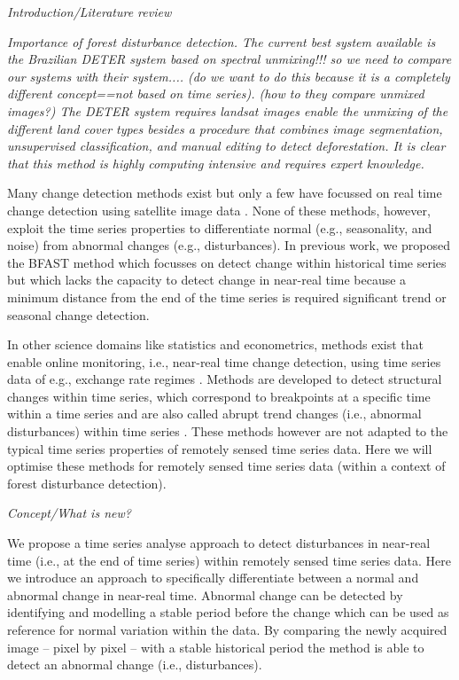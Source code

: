 \documentclass[authoryear,preprint,review,10pt]{elsarticle}
\begin{document}
\emph{Introduction/Literature review}

\emph{Importance of forest disturbance detection.
The current best system available is the Brazilian DETER system based on
spectral unmixing!!! so we need to compare our systems with their system.... (do
we want to do this because it is a completely different concept==not based on
time series).  (how to they compare unmixed images?) The DETER system
requires landsat images enable the unmixing of the different land cover types
besides a procedure that combines image segmentation, unsupervised
classification, and manual editing to detect deforestation. It is clear that
this method is highly computing intensive and requires expert knowledge.}

Many change detection methods exist but only a few have focussed on real time
change detection using satellite image data
\citep{Shimabukuro:2006vb,White2006}. None of these methods, however, exploit
the time series properties to differentiate normal (e.g., seasonality, and noise)
from abnormal changes (e.g., disturbances). In previous work, we proposed the
BFAST method which focusses on detect change within historical time series but
which lacks the capacity to detect change in near-real time because a minimum
distance from the end of the time series is required significant trend or
seasonal change detection.

In other science domains like statistics and econometrics, methods exist that
enable online monitoring, i.e., near-real time change detection, using time
series data of e.g., exchange rate regimes \citep{Zeileis:2010tt}. Methods are
developed to detect structural changes within time series, which correspond to
breakpoints at a specific time within a time series and are also called abrupt
trend changes (i.e., abnormal disturbances) within time series
\citep{Verbesselt2009a}. These methods however are not adapted to the typical
time series properties of remotely sensed time series data. Here we will
optimise these methods for remotely sensed time series data (within a context of
forest disturbance detection).

\emph{Concept/What is new?}

We propose a time series analyse approach to detect disturbances in near-real
time (i.e., at the end of time series) within remotely sensed time series data.
Here we introduce an approach to specifically differentiate between a normal and
abnormal change in near-real time. Abnormal change can be detected by
identifying and modelling a stable period before the change which can be used as
reference for normal variation within the data. By comparing the newly acquired
image -- pixel by pixel -- with a stable historical period the method is able to
detect an abnormal change (i.e., disturbances).
\end{document}
